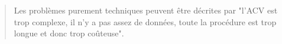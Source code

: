 \blockcquote[traduction]{udo_de_haes_applications_1993}{
Les problèmes purement techniques peuvent être décrites par "l'ACV est trop complexe, il n'y a pas assez de données, toute la procédure est trop longue et donc trop coûteuse".}

